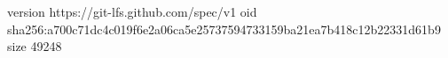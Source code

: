version https://git-lfs.github.com/spec/v1
oid sha256:a700c71dc4c019f6e2a06ca5e25737594733159ba21ea7b418c12b22331d61b9
size 49248
